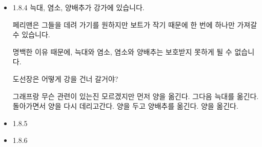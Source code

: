 \documentclass{oblivoir}
\begin{document}
\begin{itemize}
    \item 1.8.4
    늑대, 염소, 양배추가 강가에 있습니다.

페리맨은 그들을 데려 가기를 원하지만 보트가 작기 때문에 한 번에 하나만 가져갈 수 있습니다.

 명백한 이유 때문에, 늑대와 염소, 염소와 양배추는 보호받지 못하게 될 수 없습니다.
 
도선장은 어떻게 강을 건너 갈거야?

그래프랑 무슨 관련이 있는진 모르겠지만
먼저 양을 옮긴다. 그다음 늑대를 옮긴다. 돌아가면서 양을 다시 데리고간다. 양을 두고 양배추를 옮긴다. 양을 옮긴다.

    \item 1.8.5
    \item 1.8.6

\end{itemize}
\end{document}

